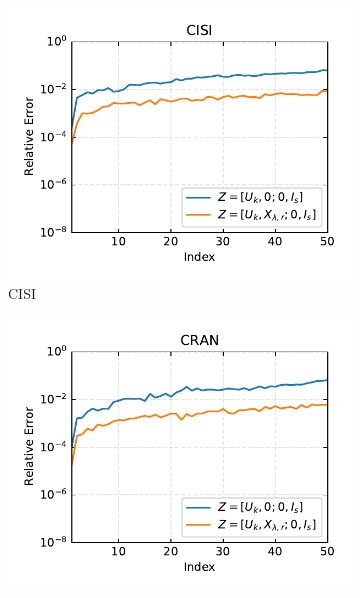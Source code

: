 
\begin{figure}[h]
    \centering
    \begin{subfigure}[b]{0.3\textwidth}
        \centering
        \includegraphics[width=\textwidth]{figures/single/cisi/relative_errors_CISI_batch_split_1.pdf}
        \caption{CISI}
        \label{fig:single_cisi_rel_err}
    \end{subfigure}
    \begin{subfigure}[b]{0.3\textwidth}
        \centering
        \includegraphics[width=\textwidth]{figures/single/cran/relative_errors_CRAN_batch_split_1.pdf}

\end{subfigure}
\end{figure}
